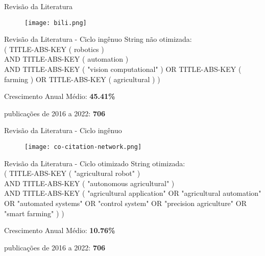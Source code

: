 \begin{frame}[c]{Revisão da Literatura}
    \begin{figure}
        \texttt{[image: bili.png]}
    \end{figure}
\end{frame}

\begin{frame}[t]{Revisão da Literatura - Ciclo ingênuo}
    \newcommand\vertspaceingenuo{0.35cm}
    String não otimizada:
    \\ ( TITLE-ABS-KEY ( robotics )  
    \\ AND  TITLE-ABS-KEY ( automation ) 
    \\ AND  TITLE-ABS-KEY ( "vision computational" )  OR  TITLE-ABS-KEY ( farming )  OR  TITLE-ABS-KEY ( agricultural ) ) 
    \vspace*{\vertspaceingenuo}

    Crescimento Anual Médio: \textbf{45.41\%}
    \vspace*{\vertspaceingenuo}

    publicações de 2016 a 2022: \textbf{706}
\end{frame}

\begin{frame}[c]{Revisão da Literatura - Ciclo ingênuo}
    \begin{figure}
        \texttt{[image: co-citation-network.png]}
    \end{figure}
\end{frame}

\begin{frame}[t]{Revisão da Literatura - Ciclo otimizado}
    \newcommand\vertspaceingenuo{0.35cm}
    String otimizada: 
    \\ ( TITLE-ABS-KEY ( "agricultural robot" ) 
    \\ AND TITLE-ABS-KEY ( "autonomous agricultural" ) 
    \\ AND TITLE-ABS-KEY ( "agricultural application" OR "agricultural automation" OR "automated systems" OR "control system" OR "precision agriculture" OR "smart farming" ) )
    \vspace*{\vertspaceingenuo}

    Crescimento Anual Médio: \textbf{10.76\%}
    \vspace*{\vertspaceingenuo}

    publicações de 2016 a 2022: \textbf{706}
\end{frame}

